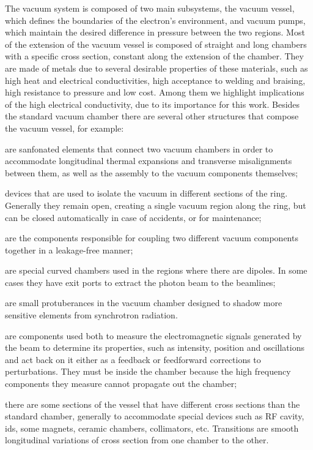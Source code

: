     The vacuum system is composed of two main subsystems, the vacuum vessel, which defines the boundaries of the electron's environment, and vacuum pumps, which maintain the desired difference in pressure between the two regions. Most of the extension of the vacuum vessel is composed of straight and long chambers with a specific cross section, constant along the extension of the chamber. They are made of metals due to several desirable properties of these materials, such as high heat and electrical conductivities, high acceptance to welding and braising, high resistance to pressure and low cost. Among them we highlight implications of the high electrical conductivity, due to its importance for this work. Besides the standard vacuum chamber there are several other structures that compose the vacuum vessel, for example:
    \begin{description}[align=left]
        \item[Bellows:] are sanfonated elements that connect two vacuum chambers in order to accommodate longitudinal thermal expansions and transverse misalignments between them, as well as the assembly to the vacuum components themselves;
        \item[Valves:] devices that are used to isolate the vacuum in different sections of the ring. Generally they remain open, creating a single vacuum region along the ring, but can be closed automatically in case of accidents, or for maintenance;
        \item[Flanges:] are the components responsible for coupling two different vacuum components together in a leakage-free manner;
        \item[Dipole Chambers:] are special curved chambers used in the regions where there are dipoles. In some cases they have exit ports to extract the photon beam to the beamlines;
        \item[Radiation Masks:] are small protuberances in the vacuum chamber designed to shadow more sensitive elements from synchrotron radiation.
        \item[Diagnostic Elements:] are components used both to measure the electromagnetic signals generated by the beam to determine its properties, such as intensity, position and oscillations and act back on it either as a feedback or feedforward corrections to perturbations. They must be inside the chamber because the high frequency components they measure cannot propagate out the chamber;
        \item[Transitions:] there are some sections of the vessel that have different cross sections than the standard chamber, generally to accommodate special devices such as RF cavity, \glspl{id}, some magnets, ceramic chambers, collimators, etc. Transitions are smooth longitudinal variations of cross section from one chamber to the other.
    \end{description}

